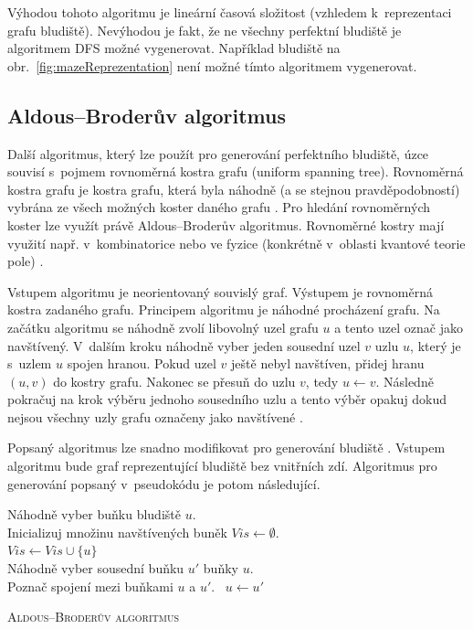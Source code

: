 \documentclass[a4paper,12pt]{article}
\begin{document}
Výhodou tohoto algoritmu je lineární časová složitost (vzhledem k~reprezentaci grafu bludiště).
Nevýhodou je fakt, že ne všechny perfektní bludiště je algoritmem DFS možné vygenerovat. Například bludiště na obr.~\ref{fig:mazeReprezentation}
není možné tímto algoritmem vygenerovat.

\subsection{Aldous--Broderův algoritmus}
Další algoritmus, který lze použít pro generování perfektního bludiště, úzce souvisí s~pojmem rovnoměrná kostra grafu (uniform spanning tree).
Rovnoměrná kostra grafu je kostra grafu, která byla náhodně (a se stejnou pravděpodobností) vybrána ze všech možných koster daného grafu \cite{mat}.
Pro hledání rovnoměrných koster lze využít právě Aldous--Broderův algoritmus. Rovnoměrné kostry mají využití např. v~kombinatorice nebo
ve fyzice (konkrétně v~oblasti kvantové teorie pole) \cite{span}.

Vstupem algoritmu je neorientovaný souvislý graf. Výstupem je rovnoměrná kostra zadaného grafu. Principem algoritmu je náhodné procházení 
grafu. Na začátku algoritmu se náhodně zvolí libovolný uzel grafu $u$ a tento uzel označ jako 
navštívený. V~dalším kroku náhodně vyber jeden
sousední uzel $v$ uzlu $u$, který je s~uzlem $u$ spojen hranou. Pokud uzel $v$ ještě nebyl navštíven, přidej hranu $(u, v)$ do 
kostry grafu. Nakonec se přesuň do uzlu $v$, tedy $u\gets v$. Následně pokračuj na krok výběru jednoho sousedního uzlu a tento
výběr opakuj dokud nejsou všechny uzly grafu označeny jako navštívené \cite{ald, mat}.

Popsaný algoritmus lze snadno modifikovat pro generování bludiště \cite{mat}. Vstupem algoritmu bude graf reprezentující bludiště bez vnitřních zdí.
Algoritmus pro generování popsaný v~pseudokódu je potom následující.

\medskip

 \begin{algorithm}[H]
 \SetNlSty{}{}{:}
 \SetNlSkip{-1.0em}
 \SetInd{0.5em}{0.5em}
 \BlankLine
 \Indentp{1.7em}
   Náhodně vyber buňku bludiště $u$. \\
   Inicializuj množinu navštívených buněk $Vis \gets \emptyset$.\\
   {
     $Vis \gets Vis \cup \{ u \}$ \\
     Náhodně vyber sousední buňku $u'$ buňky $u$.\\
     {
	Poznač spojení mezi buňkami $u$ a $u'$.\
     }
     $u \gets u'$
     }
 \caption{\textsc{Aldous--Broderův algoritmus}}
 \label{alg:aldous}
\end{algorithm}
\end{document}
